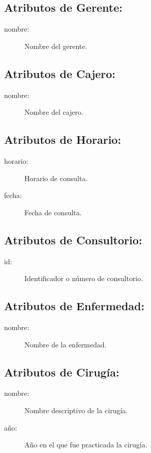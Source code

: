 \subsection{Atributos de Gerente:}
\begin{description}
\item[nombre: ]Nombre del gerente.
\end{description}

\subsection{Atributos de Cajero:}
\begin{description}
\item[nombre: ]Nombre del cajero.
\end{description}

\subsection{Atributos de Horario:}
\begin{description}
\item[horario: ]Horario de consulta.
\item[fecha: ]Fecha de consulta.
\end{description}

\subsection{Atributos de Consultorio:}
\begin{description}
\item[id: ]Identificador o número de consultorio.
\end{description}

\subsection{Atributos de Enfermedad:}
\begin{description}
\item[nombre: ]Nombre de la enfermedad.
\end{description}

\subsection{Atributos de Cirugía:}
\begin{description}
\item[nombre: ]Nombre descriptivo de la cirugía.
\item[año: ]Año en el que fue practicada la cirugía.
\end{description}

